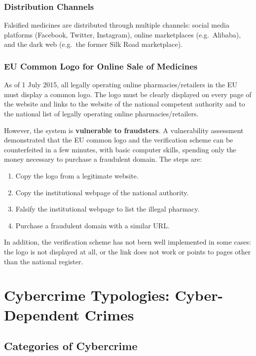 \documentclass[11pt,a4paper,openany]{report}
\theoremstyle{definition}
\theoremstyle{plain}
\theoremstyle{remark}
\begin{document}
\subsection{Distribution Channels}

Falsified medicines are distributed through multiple channels: social media platforms (Facebook, Twitter, Instagram), online marketplaces (e.g.\ Alibaba), and the dark web (e.g.\ the former Silk Road marketplace).

\subsection{EU Common Logo for Online Sale of Medicines}

As of 1 July 2015, all legally operating online pharmacies/retailers in the EU must display a common logo. The logo must be clearly displayed on every page of the website and links to the website of the national competent authority and to the national list of legally operating online pharmacies/retailers.

However, the system is \textbf{vulnerable to fraudsters}. A vulnerability assessment demonstrated that the EU common logo and the verification scheme can be counterfeited in a few minutes, with basic computer skills, spending only the money necessary to purchase a fraudulent domain. The steps are:

\begin{enumerate}
    \item Copy the logo from a legitimate website.
    \item Copy the institutional webpage of the national authority.
    \item Falsify the institutional webpage to list the illegal pharmacy.
    \item Purchase a fraudulent domain with a similar URL.
\end{enumerate}

In addition, the verification scheme has not been well implemented in some cases: the logo is not displayed at all, or the link does not work or points to pages other than the national register.


\chapter{Cybercrime Typologies: Cyber-Dependent Crimes}

\section{Categories of Cybercrime}
\end{document}
